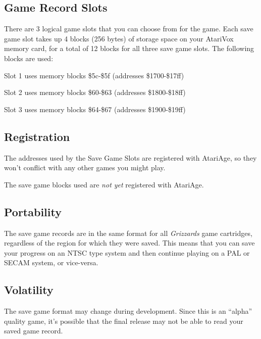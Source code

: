 \documentclass[12pt,twoside,openright,book]{memoir}
\begin{document}
\begin{description}
\section{Game Record Slots}

There are 3  logical game slots that  you can choose from  for the game.
Each save game  slot takes up 4  blocks (256 bytes) of  storage space on
your AtariVox memory card,  for a total of 12 blocks  for all three save
game slots. The following blocks are used:

\begin{enumeration}
\item Slot 1 uses memory blocks \$5c-\$5f (addresses \$1700-\$17ff)
\item Slot 2 uses memory blocks \$60-\$63 (addresses \$1800-\$18ff)
\item Slot 3 uses memory blocks \$64-\$67 (addresses \$1900-\$19ff)
\end{enumeration}

\subsection{Registration}

\ifdef\FIXMERegisterGameWithAtariAge

The addresses used by the Save Game Slots are registered with
AtariAge, so they won't conflict with any other games you might play.

\else

The save game blocks used are \emph{not yet} registered with AtariAge.

\fi

\subsection{Portability}

The save game records are in the same format for all \textit{Grizzards} game
cartridges, regardless of the region for which they were saved.  This means
that you can save your progress on an NTSC type system and then continue
playing on a PAL or SECAM system, or vice-versa.

\subsection{Volatility}

The save game format may change during development. Since this is an
``alpha'' quality game, it's possible that the final release may not
be able to read your saved game record.


\end{description}
\end{document}
